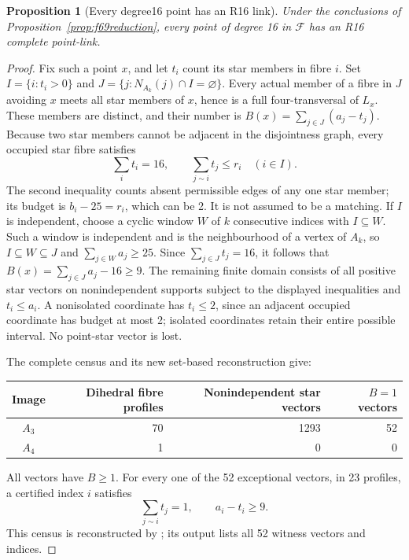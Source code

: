\documentclass[11pt,a4paper]{article}
\numberwithin{equation}{section}
\newtheorem{proposition}[theorem]{Proposition}
\theoremstyle{remark}
\newcommand{\F}{\mathcal F}
\begin{document}
\begin{proposition}[Every degree16 point has an R16 link]\label{prop:allr16}
Under the conclusions of Proposition~\ref{prop:f69reduction}, every
point of degree 16 in $\F $ has an R16 complete point-link.
\end{proposition}
\begin{proof}
Fix such a point $ x $, and let $ t_i $ count its star members in fibre $ i $.
Set $ I=\{i:t_i>0\}$ and $ J=\{j:N_{A_k}(j)\cap I=\varnothing\}$.
Every actual member of a fibre in $ J $ avoiding $ x $ meets all star
members of $ x $, hence is a full four-transversal of $ L_x $. These members
are distinct, and their number is
$ B(x)=\sum_{j\in J}(a_j-t_j)$.
Because two star members cannot be adjacent in the disjointness graph,
every occupied star fibre satisfies
\[
 \sum_i t_i=16,\qquad \sum_{j\sim i}t_j\le r_i\quad(i\in I).
\]
The second inequality counts absent permissible edges of any one star
member; its budget is $ b_i-25=r_i $, which can be 2. It is not assumed
to be a matching. If $ I $ is independent, choose a cyclic window $ W $
of $ k $ consecutive indices with $ I\subseteq W $. Such a window is
independent and is the neighbourhood of a vertex of $ A_k $, so
$ I\subseteq W\subseteq J $ and $\sum_{j\in W}a_j\ge25$.
Since $\sum_{j\in J}t_j=16$, it follows that
$ B(x)=\sum_{j\in J}a_j-16\ge9$.
The remaining finite domain consists of all positive star vectors on
nonindependent supports subject to the displayed inequalities and
$ t_i\le a_i $. A nonisolated coordinate has $ t_i\le 2$, since an
adjacent occupied coordinate has budget at most 2; isolated coordinates
retain their entire possible interval. No point-star vector is lost.

The complete census and its new set-based reconstruction give:
\begin{center}
\begin{tabular}{c r r r}\toprule
Image&Dihedral fibre profiles&Nonindependent star vectors&$ B=1$ vectors\\\midrule
$ A_3$&70&1293&52\\
$ A_4$&1&0&0\\\bottomrule
\end{tabular}
\end{center}
All vectors have $ B\ge 1$. For every one of the 52 exceptional vectors,
in 23 profiles, a certified index $ i $ satisfies
\[
 \sum_{j\sim i}t_j=1,\qquad a_i-t_i\ge 9.
\]
This census is reconstructed by ; its
output lists all 52 witness vectors and indices.


\end{proof}
\end{document}
